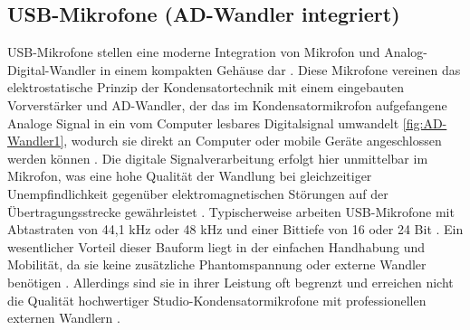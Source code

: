 \subsection{USB-Mikrofone (AD-Wandler integriert)}
USB-Mikrofone stellen eine moderne Integration von Mikrofon und Analog-Digital-Wandler in einem kompakten Gehäuse dar \cite{Weinzierl:2008}. Diese Mikrofone vereinen das elektrostatische Prinzip der Kondensatortechnik mit einem eingebauten Vorverstärker und AD-Wandler, der das im Kondensatormikrofon aufgefangene Analoge Signal in ein vom Computer lesbares Digitalsignal umwandelt \ref{fig:AD-Wandler1}, wodurch sie direkt an Computer oder mobile Geräte angeschlossen werden können \cite{Weinzierl:2008}.
Die digitale Signalverarbeitung erfolgt hier unmittelbar im Mikrofon, was eine hohe Qualität der Wandlung bei gleichzeitiger Unempfindlichkeit gegenüber elektromagnetischen Störungen auf der Übertragungsstrecke gewährleistet \cite{Weinzierl:2008}. Typischerweise arbeiten USB-Mikrofone mit Abtastraten von 44,1 kHz oder 48 kHz und einer Bittiefe von 16 oder 24 Bit \cite{Weinzierl:2008}.
Ein wesentlicher Vorteil dieser Bauform liegt in der einfachen Handhabung und Mobilität, da sie keine zusätzliche Phantomspannung oder externe Wandler benötigen \cite{Weinzierl:2008}. Allerdings sind sie in ihrer Leistung oft begrenzt und erreichen nicht die Qualität hochwertiger Studio-Kondensatormikrofone mit professionellen externen Wandlern \cite{Weinzierl:2008}.

\bigskip


